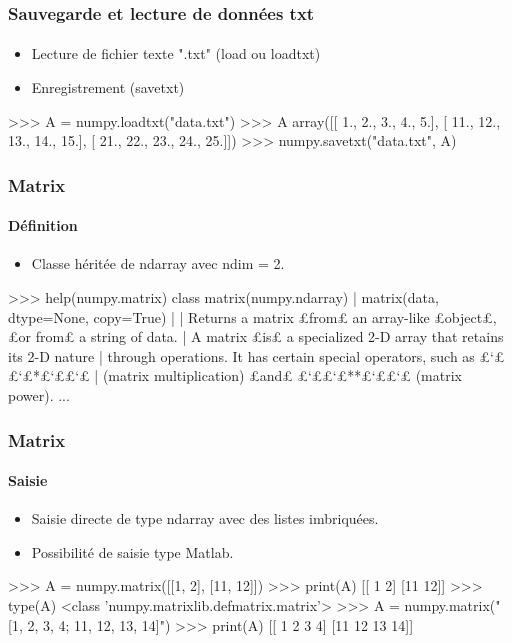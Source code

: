 \begin{frame}[fragile]
\frametitle{Sauvegarde et lecture de données txt}
\framesubtitle{}
\begin{itemize}
 \item Lecture de fichier texte ".txt" (load ou loadtxt) 
 \item Enregistrement (savetxt) 
\end{itemize}
\begin{pythonConsole}
>>> A = numpy.loadtxt("data.txt")
>>> A
array([[  1.,   2.,   3.,   4.,   5.],
       [ 11.,  12.,  13.,  14.,  15.],
       [ 21.,  22.,  23.,  24.,  25.]])
>>> numpy.savetxt("data.txt", A)
\end{pythonConsole}
\end{frame}
\begin{frame}[fragile]
\frametitle{Matrix}
\framesubtitle{Définition}
\begin{itemize}
 \item Classe héritée de ndarray avec ndim = 2.  
\end{itemize}
\begin{pythonConsole}
>>> help(numpy.matrix)
class matrix(numpy.ndarray)         
 |  matrix(data, dtype=None, copy=True)
 |  
 |  Returns a matrix £from£ an array-like £object£, £or from£ a string of data.
 |  A matrix £is£ a specialized 2-D array that retains its 2-D nature
 |  through operations.  It has certain special operators, such as £`££`£*£`££`£
 |  (matrix multiplication) £and£ £`££`£**£`££`£ (matrix power).
...
\end{pythonConsole}
\end{frame}
\begin{frame}[fragile]
\frametitle{Matrix}
\framesubtitle{Saisie}
\begin{itemize}
 \item Saisie directe de type ndarray avec des listes imbriquées. 
 \item Possibilité de saisie type Matlab.
\end{itemize}
\begin{pythonConsole}
>>> A = numpy.matrix([[1, 2], [11, 12]])
>>> print(A)
[[ 1  2]
 [11 12]]
>>> type(A)
 <class 'numpy.matrixlib.defmatrix.matrix'>
>>> A = numpy.matrix("[1, 2, 3, 4; 11, 12, 13, 14]")
>>> print(A)
[[ 1  2  3  4]
 [11 12 13 14]]
\end{pythonConsole}
\end{frame}
